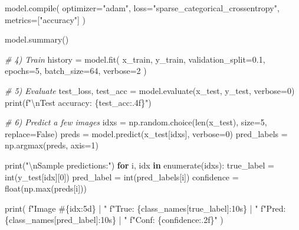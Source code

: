 \documentclass[
  12pt,
  letterpaper,
  oneside]{report}
\newenvironment{Shaded}{}{}
\newcommand{\BuiltInTok}[1]{\textcolor[rgb]{0.00,0.50,0.00}{#1}}
\newcommand{\CharTok}[1]{\textcolor[rgb]{0.25,0.44,0.63}{#1}}
\newcommand{\CommentTok}[1]{\textcolor[rgb]{0.38,0.63,0.69}{\textit{#1}}}
\newcommand{\ControlFlowTok}[1]{\textcolor[rgb]{0.00,0.44,0.13}{\textbf{#1}}}
\newcommand{\DecValTok}[1]{\textcolor[rgb]{0.25,0.63,0.44}{#1}}
\newcommand{\FloatTok}[1]{\textcolor[rgb]{0.25,0.63,0.44}{#1}}
\newcommand{\KeywordTok}[1]{\textcolor[rgb]{0.00,0.44,0.13}{\textbf{#1}}}
\newcommand{\NormalTok}[1]{#1}
\newcommand{\OperatorTok}[1]{\textcolor[rgb]{0.40,0.40,0.40}{#1}}
\newcommand{\SpecialCharTok}[1]{\textcolor[rgb]{0.25,0.44,0.63}{#1}}
\newcommand{\SpecialStringTok}[1]{\textcolor[rgb]{0.73,0.40,0.53}{#1}}
\newcommand{\StringTok}[1]{\textcolor[rgb]{0.25,0.44,0.63}{#1}}
\newcommand{\VariableTok}[1]{\textcolor[rgb]{0.10,0.09,0.49}{#1}}
\begin{document}
\begin{Shaded}
\begin{Highlighting}[]
\NormalTok{    model.}\BuiltInTok{compile}\NormalTok{(}
\NormalTok{        optimizer}\OperatorTok{=}\StringTok{"adam"}\NormalTok{,}
\NormalTok{        loss}\OperatorTok{=}\StringTok{"sparse\_categorical\_crossentropy"}\NormalTok{,}
\NormalTok{        metrics}\OperatorTok{=}\NormalTok{[}\StringTok{"accuracy"}\NormalTok{]}
\NormalTok{    )}

\NormalTok{    model.summary()}

    \CommentTok{\# 4) Train}
\NormalTok{    history }\OperatorTok{=}\NormalTok{ model.fit(}
\NormalTok{        x\_train, y\_train,}
\NormalTok{        validation\_split}\OperatorTok{=}\FloatTok{0.1}\NormalTok{,}
\NormalTok{        epochs}\OperatorTok{=}\DecValTok{5}\NormalTok{,}
\NormalTok{        batch\_size}\OperatorTok{=}\DecValTok{64}\NormalTok{,}
\NormalTok{        verbose}\OperatorTok{=}\DecValTok{2}
\NormalTok{    )}

    \CommentTok{\# 5) Evaluate}
\NormalTok{    test\_loss, test\_acc }\OperatorTok{=}\NormalTok{ model.evaluate(x\_test, y\_test, verbose}\OperatorTok{=}\DecValTok{0}\NormalTok{)}
    \BuiltInTok{print}\NormalTok{(}\SpecialStringTok{f"}\CharTok{\textbackslash{}n}\SpecialStringTok{Test accuracy: }\SpecialCharTok{\{}\NormalTok{test\_acc}\SpecialCharTok{:.4f\}}\SpecialStringTok{"}\NormalTok{)}

    \CommentTok{\# 6) Predict a few images}
\NormalTok{    idxs }\OperatorTok{=}\NormalTok{ np.random.choice(}\BuiltInTok{len}\NormalTok{(x\_test), size}\OperatorTok{=}\DecValTok{5}\NormalTok{, replace}\OperatorTok{=}\VariableTok{False}\NormalTok{)}
\NormalTok{    preds }\OperatorTok{=}\NormalTok{ model.predict(x\_test[idxs], verbose}\OperatorTok{=}\DecValTok{0}\NormalTok{)}
\NormalTok{    pred\_labels }\OperatorTok{=}\NormalTok{ np.argmax(preds, axis}\OperatorTok{=}\DecValTok{1}\NormalTok{)}

    \BuiltInTok{print}\NormalTok{(}\StringTok{"}\CharTok{\textbackslash{}n}\StringTok{Sample predictions:"}\NormalTok{)}
    \ControlFlowTok{for}\NormalTok{ i, idx }\KeywordTok{in} \BuiltInTok{enumerate}\NormalTok{(idxs):}
\NormalTok{        true\_label }\OperatorTok{=} \BuiltInTok{int}\NormalTok{(y\_test[idx][}\DecValTok{0}\NormalTok{])}
\NormalTok{        pred\_label }\OperatorTok{=} \BuiltInTok{int}\NormalTok{(pred\_labels[i])}
\NormalTok{        confidence }\OperatorTok{=} \BuiltInTok{float}\NormalTok{(np.}\BuiltInTok{max}\NormalTok{(preds[i]))}

        \BuiltInTok{print}\NormalTok{(}
            \SpecialStringTok{f"Image \#}\SpecialCharTok{\{}\NormalTok{idx}\SpecialCharTok{:5d\}}\SpecialStringTok{ | "}
            \SpecialStringTok{f"True: }\SpecialCharTok{\{}\NormalTok{class\_names[true\_label]}\SpecialCharTok{:10s\}}\SpecialStringTok{ | "}
            \SpecialStringTok{f"Pred: }\SpecialCharTok{\{}\NormalTok{class\_names[pred\_label]}\SpecialCharTok{:10s\}}\SpecialStringTok{ | "}
            \SpecialStringTok{f"Conf: }\SpecialCharTok{\{}\NormalTok{confidence}\SpecialCharTok{:.2f\}}\SpecialStringTok{"}
\NormalTok{        )}


\end{Highlighting}
\end{Shaded}
\end{document}
